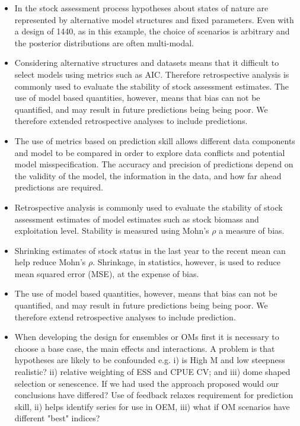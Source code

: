 \begin{itemize}
    \item In the stock assessment process hypotheses about states of nature are represented by alternative model structures and fixed parameters. Even with a design of 1440, as in this example, the choice of scenarios is arbitrary and the posterior distributions are often multi-modal.
    
    \item Considering alternative structures and datasets means that it difficult to select models using metrics such as AIC. Therefore retrospective analysis is commonly used to evaluate the stability of stock assessment estimates.  The use of model based quantities, however, means that bias can not be quantified, and may result in future predictions being being poor. We therefore extended retrospective analyses to include predictions. 
   
    \item The use of metrics based on prediction skill allows different data components and model to be compared in order to explore data conflicts and potential model misspecification. The accuracy and precision of predictions depend on the validity of the model, the information in the data, and how far ahead predictions are required. 
   
    \item Retrospective analysis is commonly used to evaluate the stability of stock assessment estimates of model estimates such as stock biomass and exploitation level. Stability is measured using Mohn's $\rho$ a measure of bias. 
    
    \item Shrinking estimates of stock status in the last year to the recent mean can help reduce Mohn's $\rho$. Shrinkage, in statistics, however, is used to reduce mean squared error (MSE), at the expense of bias. 
    
    \item The use of model based quantities, however, means that bias can not be quantified, and may result in future predictions being being poor. We therefore extend retrospective analyses to include prediction. 

    \item When developing the design for ensembles or OMs first it is necessary to choose a base case, the main effects and interactions. A problem is that hypotheses are likely to be confounded e.g. i) is High M and low steepness realistic? ii) relative weighting of ESS and CPUE CV; and iii) dome shaped selection or senescence. If we had used the approach proposed would our conclusions have differed? Use of feedback relaxes requirement for prediction skill, ii) helps identify series for use in OEM, iii) what if OM scenarios have different "best" indices?


\end{itemize}
